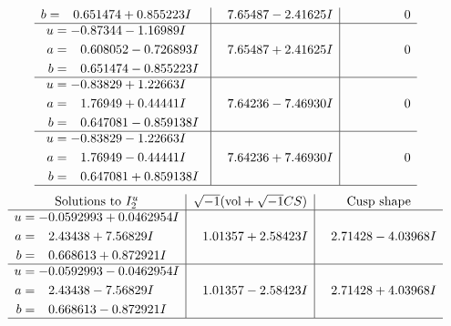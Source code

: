 \documentclass[1p]{elsarticle_modified}
\theoremstyle{definition}
\newcommand{\I}{\sqrt{-1}}
\begin{document}
$$\begin{array}{c|c|c}
\begin{aligned}
b &= \phantom{-}0.651474 + 0.855223 I\end{aligned}
 & \phantom{-}7.65487 - 2.41625 I & \phantom{-0.000000 } 0 \\ \hline\begin{aligned}
u &= -0.87344 - 1.16989 I \\
a &= \phantom{-}0.608052 - 0.726893 I \\
b &= \phantom{-}0.651474 - 0.855223 I\end{aligned}
 & \phantom{-}7.65487 + 2.41625 I & \phantom{-0.000000 } 0 \\ \hline\begin{aligned}
u &= -0.83829 + 1.22663 I \\
a &= \phantom{-}1.76949 + 0.44441 I \\
b &= \phantom{-}0.647081 - 0.859138 I\end{aligned}
 & \phantom{-}7.64236 - 7.46930 I & \phantom{-0.000000 } 0 \\ \hline\begin{aligned}
u &= -0.83829 - 1.22663 I \\
a &= \phantom{-}1.76949 - 0.44441 I \\
b &= \phantom{-}0.647081 + 0.859138 I\end{aligned}
 & \phantom{-}7.64236 + 7.46930 I & \phantom{-0.000000 } 0\\
 \hline 
 \end{array}$$\newpage$$\begin{array}{c|c|c}  
\text{Solutions to }I^u_{2}& \I (\text{vol} + \sqrt{-1}CS) & \text{Cusp shape}\\
 \hline 
\begin{aligned}
u &= -0.0592993 + 0.0462954 I \\
a &= \phantom{-}2.43438 + 7.56829 I \\
b &= \phantom{-}0.668613 + 0.872921 I\end{aligned}
 & \phantom{-}1.01357 + 2.58423 I & \phantom{-}2.71428 - 4.03968 I \\ \hline\begin{aligned}
u &= -0.0592993 - 0.0462954 I \\
a &= \phantom{-}2.43438 - 7.56829 I \\
b &= \phantom{-}0.668613 - 0.872921 I\end{aligned}
 & \phantom{-}1.01357 - 2.58423 I & \phantom{-}2.71428 + 4.03968 I\\
 \hline 
 \end{array}$$\newpage\newpage\renewcommand{\arraystretch}{1}
\end{document}
